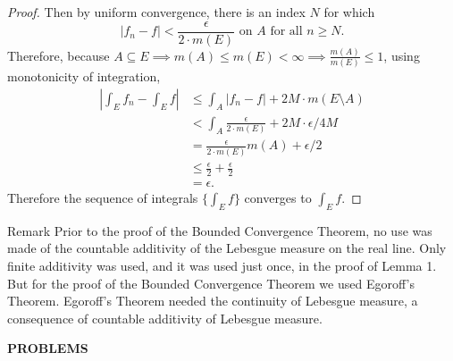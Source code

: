 \begin{flushleft}
\begin{proof}
        Then by uniform convergence, there is an index $N$ for which 
        \[
            |f_n-f|<\frac{\epsilon}{2\cdot m(E)}\text{ on }A\text{ for all }n\ge N.
        \]
        Therefore, because $A\subseteq E\implies m(A)\le m(E)<\infty\implies \frac{m(A)}{m(E)}\le1$, using monotonicity of integration,
        \begin{align*}
            \left|\int_Ef_n-\int_Ef\right|&\le\int_A|f_n-f|+2M\cdot m(E\setminus A)\\
            &<\int_A\frac{\epsilon}{2\cdot m(E)}+2M\cdot\epsilon/4M\\
            &=\frac{\epsilon}{2\cdot m(E)}m(A)+\epsilon/2\\
            &\le\frac{\epsilon}{2}+\frac{\epsilon}{2}\\
            &=\epsilon.
        \end{align*}
        Therefore the sequence of integrals $\{\int_Ef\}$ converges to $\int_Ef$.
    \end{proof}
\begin{namedthm*}{Remark}
    Prior to the proof of the Bounded Convergence Theorem, no use was made of the countable additivity of the Lebesgue measure on the real line.
    Only finite additivity was used, and it was used just once, in the proof of Lemma 1. But for the proof of the Bounded Convergence Theorem we used Egoroff's Theorem.
    Egoroff's Theorem needed the continuity of Lebesgue measure, a consequence of countable additivity of Lebesgue measure.    
\end{namedthm*}

\end{flushleft}
\begin{center}
	\textbf{PROBLEMS}
\end{center}
